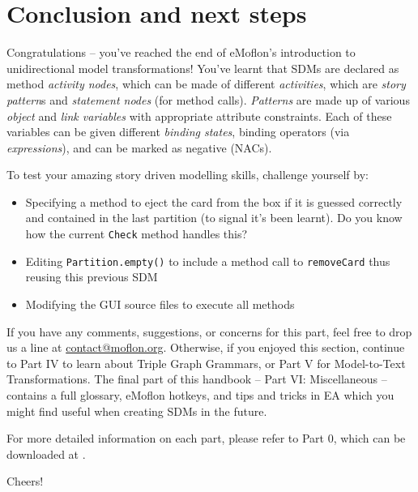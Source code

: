 \genHeader
\section{Conclusion and next steps}

\vspace{0.5cm}

Congratulations -- you've reached the end of eMoflon's introduction to unidirectional model transformations! You've learnt that SDMs are declared as method
\emph{activity nodes}, which can be made of different \emph{activities}, which are \emph{story pattern}s and \emph{statement nodes} (for method calls).
\emph{Patterns} are made up of various \emph{object} and \emph{link variables} with appropriate attribute constraints. Each of these variables can be given
different \emph{binding states}, binding operators (via \emph{expressions}), and can be marked as negative (NACs).

\vspace{0.5cm}

To test your amazing story driven modelling skills, challenge yourself by:
\begin{itemize}
\item Specifying a method to eject the card from the box if it is guessed correctly and contained in the last partition (to signal it's been learnt). Do you
know how the current \texttt{Check} method handles this?
\item Editing \texttt{Partition.empty()} to include a method call to \texttt{removeCard} thus reusing this previous SDM
\item Modifying the GUI source files to execute all methods
\end{itemize}

\vspace{0.5cm}
	
If you have any comments, suggestions, or concerns for this part, feel free to drop us a line at \href{mailto:contact@moflon.org}{contact@moflon.org}.
Otherwise, if you enjoyed this section, continue to Part IV to learn about Triple Graph Grammars, or Part V for Model-to-Text Transformations.
The final part of this handbook -- Part VI: Miscellaneous -- contains a full glossary, eMoflon hotkeys, and tips and tricks in EA which you might find
useful when creating SDMs in the future.

For more detailed information on each part, please refer to Part 0, which can be downloaded at \dlPartZero.
\vspace{0.5cm}

Cheers!
